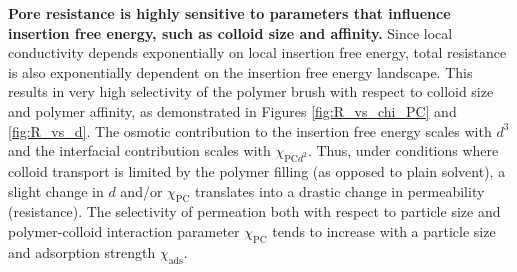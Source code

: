 \documentclass[12pt, a4paper]{article}
\begin{document}

\textbf{Pore resistance is highly sensitive to parameters that influence insertion free energy, such as colloid size and affinity.}
Since local conductivity depends exponentially on local insertion free energy, total resistance is also exponentially dependent on the insertion free energy landscape.
This results in very high selectivity of the polymer brush with respect to colloid size and polymer affinity, as demonstrated in Figures \ref{fig:R_vs_chi_PC} and \ref{fig:R_vs_d}.
The osmotic contribution to the insertion free energy scales with $d^3$ and the interfacial contribution scales with $\chi_{\text{PC} d^2}$.
Thus, under conditions where colloid transport is limited by the polymer filling (as opposed to plain solvent), a slight change in $d$ and/or $\chi_{\text{PC}}$ translates into a drastic change in permeability (resistance).
The selectivity of permeation both with respect to particle size and polymer-colloid interaction parameter $\chi_{\text{PC}}$ tends to increase with a particle size and adsorption strength $\chi_{\text{ads}}$.



\end{document}
